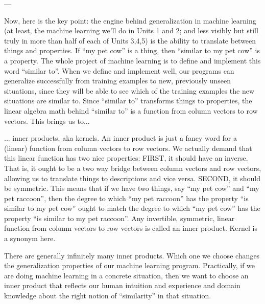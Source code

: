 \documentclass[11pt, justified]{tufte-book}
\newcommand{\samsubsubsection}[1]{
   \vspace{0.1cm}
   \par\noindent{\hspace{-2cm}\normalsize \sc \gre #1} ---
}
\theoremstyle{definition}
\begin{document}
      \samsubsubsection{inner products}
        Now, here is the key point: the engine behind generalization in machine
        learning (at least, the machine learning we'll do in Units 1 and 2; and
        less visibly but still truly in more than half of each of Units 3,4,5)
        is the ability to translate between things and properties.  If ``my pet
        cow'' is a thing, then ``similar to my pet cow'' is a property.  The whole
        project of machine learning is to define and implement this word
        ``similar to''.  When we define and implement well, our programs can
        generalize successfully from training examples to new, previously
        unseen situations, since they will be able to see which of the training
        examples the new situations are similar to.  Since ``similar to''
        transforms things to properties, the linear algebra math behind
        ``similar to'' is a function from column vectors to row vectors.  This
        brings us to...

        ... inner products, aka kernels.  An inner product is just a fancy word
        for a (linear) function from column vectors to row vectors.  We
        actually demand that this linear function has two nice properties:
        FIRST, it should have an inverse.  That is, it ought to be a two way
        bridge between column vectors and row vectors, allowing us to translate
        things to descriptions and vice versa.  SECOND, it should be symmetric.
        This means that if we have two things, say ``my pet cow'' and ``my pet
        raccoon'', then the degree to which ``my pet raccoon'' has the property
        ``is similar to my pet cow'' ought to match the degree to which ``my pet
        cow'' has the property ``is similar to my pet raccoon''.  Any invertible,
        symmetric, linear function from column vectors to row vectors is called
        an inner product.  Kernel is a synonym here.

        There are generally infinitely many inner products.  Which one we
        choose changes the generalization properties of our machine learning
        program.  Practically, if we are doing machine learning in a concrete
        situation, then we want to choose an inner product that reflects our
        human intuition and experience and domain knowledge about the right
        notion of ``similarity'' in that situation.
        
\end{document}
